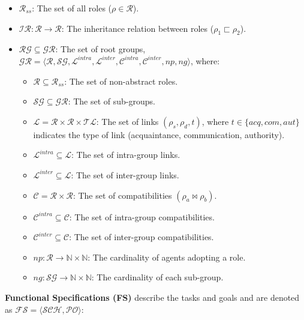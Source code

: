 \documentclass[conference]{IEEEtran}
\newcounter{relation}
\begin{document}
\begin{itemize}
    \item $\mathcal{R}_{ss}$: The set of all roles ($\rho \in \mathcal{R}$).
    \item $\mathcal{IR}: \mathcal{R} \rightarrow \mathcal{R}$: The inheritance relation between roles ($\rho_1 \sqsubset \rho_2$).
    \item $\mathcal{RG} \subseteq \mathcal{GR}$: The set of root groups, $\mathcal{GR} = \langle \mathcal{R}, \mathcal{SG}, \mathcal{L}^{intra}, \mathcal{L}^{inter}, \mathcal{C}^{intra}, \mathcal{C}^{inter}, np, ng \rangle$, where:
          \begin{itemize}
              \item $\mathcal{R} \subseteq \mathcal{R}_{ss}$: The set of non-abstract roles.
              \item $\mathcal{SG} \subseteq \mathcal{GR}$: The set of sub-groups.
              \item $\mathcal{L} = \mathcal{R} \times \mathcal{R} \times \mathcal{TL}$: The set of links $(\rho_s, \rho_d, t)$, where $t \in \{acq, com, aut\}$ indicates the type of link (acquaintance, communication, authority).
              \item $\mathcal{L}^{intra} \subseteq \mathcal{L}$: The set of intra-group links.
              \item $\mathcal{L}^{inter} \subseteq \mathcal{L}$: The set of inter-group links.
              \item $\mathcal{C} = \mathcal{R} \times \mathcal{R}$: The set of compatibilities $(\rho_a \bowtie \rho_b)$.
              \item $\mathcal{C}^{intra} \subseteq \mathcal{C}$: The set of intra-group compatibilities.
              \item $\mathcal{C}^{inter} \subseteq \mathcal{C}$: The set of inter-group compatibilities.
              \item $np: \mathcal{R} \rightarrow \mathbb{N} \times \mathbb{N}$: The cardinality of agents adopting a role.
              \item $ng: \mathcal{SG} \rightarrow \mathbb{N} \times \mathbb{N}$: The cardinality of each sub-group.
          \end{itemize}
\end{itemize}

\textbf{Functional Specifications (FS)} describe the tasks and goals and are denoted as $\mathcal{FS} = \langle \mathcal{SCH}, \mathcal{PO} \rangle$:
\end{document}
